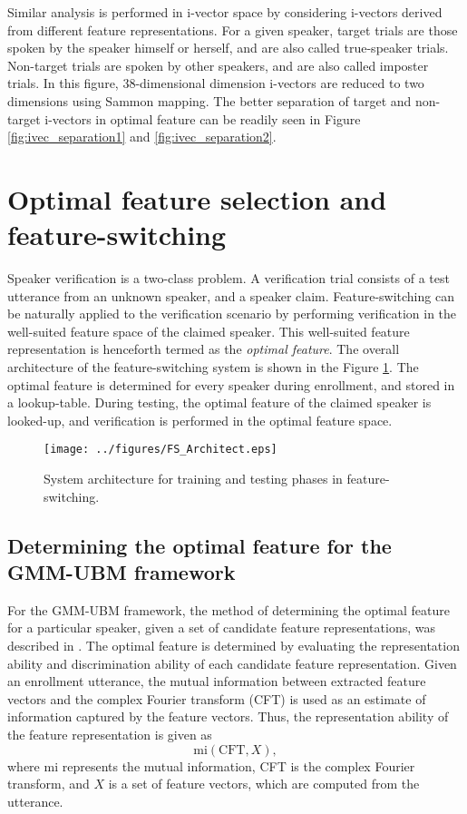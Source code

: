 \documentclass[preprint,12pt,5p]{elsarticle}
\begin{document}
Similar analysis is performed in i-vector space by considering i-vectors derived
from different feature representations.  For a given speaker, target trials are
those spoken by the speaker himself or herself, and are also called true-speaker
trials. Non-target trials are spoken by other speakers, and are also called
imposter trials. In this figure, 38-dimensional dimension i-vectors are reduced
to two dimensions using Sammon mapping. The better separation of target and
non-target i-vectors in optimal feature  can be readily seen in Figure
\ref{fig:ivec_separation1} and \ref{fig:ivec_separation2}.  


\section{Optimal feature selection and feature-switching}
\label{sec:optFeat}

Speaker verification is a two-class problem. A verification trial consists of a
test utterance from an unknown speaker, and a speaker claim. Feature-switching
can be naturally applied to the verification scenario by performing
verification in the well-suited feature space of the claimed speaker. This
well-suited feature representation is henceforth termed as the \emph{optimal
feature}. The overall architecture of the feature-switching system is shown in the
Figure \ref{fig:systemArch}. The optimal feature is determined for every speaker
during enrollment, and stored in a lookup-table. During testing, the optimal
feature of the claimed speaker is looked-up, and verification is performed in
the optimal feature space.

\begin{figure}[th]
\centering
\texttt{[image: ../figures/FS\_Architect.eps]}
\caption{System architecture for training and testing phases in feature-switching.}
\label{fig:systemArch}
\end{figure}

\subsection{Determining the optimal feature for the GMM-UBM framework}
\label{subsec:ubm_optFeat}

For the GMM-UBM framework, the method of determining the optimal feature for a
particular speaker, given a set of candidate feature representations, was
described in \cite{padmanInterspeech2010}. The optimal feature is determined by
evaluating the representation ability and discrimination ability
of each candidate feature representation. Given an enrollment utterance, the
mutual information between extracted feature vectors and the complex Fourier
transform (CFT) is used as an estimate of information captured by the feature
vectors. Thus, the representation ability of the feature representation is given
as 
\begin{equation}
\textrm{mi}(\textrm{CFT},X),
\end{equation}
where $\textrm{mi}$ represents the mutual information, CFT is the complex
Fourier transform, and $X$ is a set of feature vectors, which are computed from
the utterance.
\end{document}
